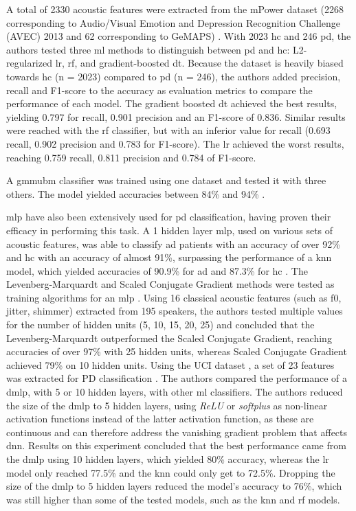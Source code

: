 A total of 2330 acoustic features were extracted from the mPower dataset \cite{mPower} (2268 corresponding to Audio/Visual Emotion and Depression Recognition Challenge (AVEC) 2013 and 62 corresponding to GeMAPS) \cite{parkinson_acoustic_tracy}. With 2023 \gls{hc} and 246 \gls{pd}, the authors tested three \gls{ml} methods to distinguish between \gls{pd} and \gls{hc}: L2-regularized \gls{lr}, \gls{rf}, and gradient-boosted \gls{dt}. Because the dataset is heavily biased towards \gls{hc} (n = 2023) compared to \gls{pd} (n = 246), the authors added precision, recall and F1-score to the accuracy as evaluation metrics to compare the performance of each model. The gradient boosted \gls{dt} achieved the best results, yielding 0.797 for recall, 0.901 precision and an F1-score of 0.836. Similar results were reached with the \gls{rf} classifier, but with an inferior value for recall (0.693 recall, 0.902 precision and 0.783 for F1-score). The \gls{lr} achieved the worst results, reaching 0.759 recall, 0.811 precision and 0.784 of F1-score.

A \gls{gmmubm} classifier was trained using one dataset and tested it with three others. The model yielded accuracies between 84\% and 94\% \cite{parkinson_phonemic_relevance}.

\gls{mlp} have also been extensively used for \gls{pd} classification, having proven their efficacy in performing this task. A 1 hidden layer \gls{mlp}, used on various sets of acoustic features, was able to classify \gls{ad} patients with an accuracy of over 92\% and \gls{hc} with an accuracy of almost 91\%, surpassing the performance of a \gls{knn} model, which yielded accuracies of 90.9\% for \gls{ad} and 87.3\% for \gls{hc} \cite{alzheimer_2014_1}. The Levenberg-Marquardt and Scaled Conjugate Gradient methods were tested as training algorithms for an \gls{mlp} \cite{parkinson_mlp}. Using 16 classical acoustic features (such as \gls{f0}, jitter, shimmer) extracted from 195 speakers, the authors tested multiple values for the number of hidden units (5, 10, 15, 20, 25) and concluded that the Levenberg-Marquardt outperformed the Scaled Conjugate Gradient, reaching accuracies of over 97\% with 25 hidden units, whereas Scaled Conjugate Gradient achieved 79\% on 10 hidden units. Using the UCI dataset \cite{UCI}, a set of 23 features was extracted for PD classification \cite{deep_mlp_parkinson}. The authors compared the performance of a \gls{dmlp}, with 5 or 10 hidden layers, with other \gls{ml} classifiers. The authors reduced the size of the \gls{dmlp} to 5 hidden layers, using \textit{ReLU} or \textit{softplus} as non-linear activation functions instead of the latter activation function, as these are continuous and can therefore address the vanishing gradient problem that affects \gls{dnn}. Results on this experiment concluded that the best performance came from the \gls{dmlp} using 10 hidden layers, which yielded 80\% accuracy, whereas the \gls{lr} model only reached 77.5\% and the \gls{knn} could only get to 72.5\%. Dropping the size of the \gls{dmlp} to 5 hidden layers reduced the model's accuracy to 76\%, which was still higher than some of the tested models, such as the \gls{knn} and \gls{rf} models.

